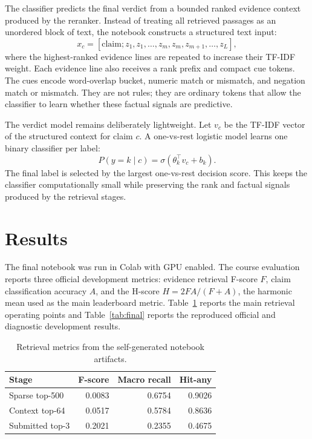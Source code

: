 \documentclass[11pt]{article}
\begin{document}
The classifier predicts the final verdict from a bounded ranked evidence context
produced by the reranker.  Instead of treating all retrieved passages as an
unordered block of text, the notebook constructs a structured text input:
\[
x_c=[\mathrm{claim}; z_1,z_1,\ldots,z_m,z_m,z_{m+1},\ldots,z_L],
\]
where the highest-ranked evidence lines are repeated to increase their TF-IDF
weight.  Each evidence line also receives a rank prefix and compact cue tokens.
The cues encode word-overlap bucket, numeric match or mismatch, and negation
match or mismatch.  They are not rules; they are ordinary tokens that allow the
classifier to learn whether these factual signals are predictive.

The verdict model remains deliberately lightweight.  Let $v_c$ be the TF-IDF
vector of the structured context for claim $c$.  A one-vs-rest logistic model
learns one binary classifier per label:
\[
P(y=k\mid c)=\sigma(\theta_k^\top v_c+b_k).
\]
The final label is selected by the largest one-vs-rest decision score.  This
keeps the classifier computationally small while preserving the rank and factual
signals produced by the retrieval stages.

\newpage

\section{Results}

The final notebook was run in Colab with GPU enabled.
The course evaluation reports three official development metrics: evidence
retrieval F-score $F$, claim classification accuracy $A$, and the H-score
$H=2FA/(F+A)$, the harmonic mean used as the main leaderboard metric.
Table~\ref{tab:retrieval} reports the main retrieval operating points and
Table~\ref{tab:final} reports the reproduced official and diagnostic
development results.

\begin{table}[t]
\centering
\small
\begin{tabular}{lrrr}
\toprule
Stage & F-score & Macro recall & Hit-any \\
\midrule
Sparse top-500 & 0.0083 & 0.6754 & 0.9026 \\
Context top-64 & 0.0517 & 0.5784 & 0.8636 \\
Submitted top-3 & 0.2021 & 0.2355 & 0.4675 \\
\bottomrule
\end{tabular}
\caption{Retrieval metrics from the self-generated notebook artifacts.}
\label{tab:retrieval}
\end{table}
\end{document}
